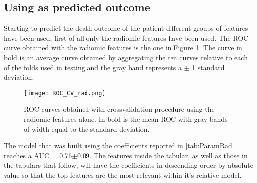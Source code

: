 \subsection{Using \death as predicted outcome}
Starting to predict the death outcome of the patient different groups of features have been used, first of all only the radiomic features have been used. The ROC curve obtained with the radiomic features is the one in Figure \ref{RocDeathRad}. The curve in bold is an average curve obtained by aggregating the ten curves relative to each of the folds used in testing and the gray band represents a $\pm$ 1 standard deviation.

\begin{figure}[htbp]
	\centering
  		\texttt{[image: ROC\_CV\_rad.png]}
        \caption{ROC curves obtained with crossvalidation procedure using the radiomic features alone. In bold is the mean ROC with gray bands of width equal to the standard deviation. \label{RocDeathRad}}
\end{figure}

The model that was built using the coefficients reported in \ref{tab:ParamRad} reaches a AUC = 0.76$\pm$0.09. The features inside the tabular, as well as those in the tabulars that follow, will have the coefficients in descending order by absolute value so that the top features are the most relevant within it's relative model.

